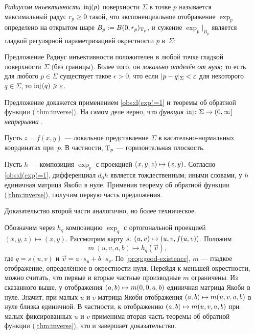 \emph{Радиусом инъективности} $\mathop{\rm inj}\nolimits(p)$ поверхности $\Sigma$ в точке $p$ называется максимальный радус $r_p\ge 0$ такой, что экспоненциальное отображение $\exp_p$ определено на открытом шаре $B_p\z\df B(0,r_p)_{\T_p}$,
и сужение $\exp_p|_{B_p}$ является гладкой регулярной параметризацией окрестности $p$ в~$\Sigma$;


\begin{thm}{Предложение}\label{prop:exp}
Радиус инъективности положителен в любой точке гладкой поверхности $\Sigma$ (без границы).
Более того, он {}\emph{локально отделён от нуля};
то есть для любого $p\in \Sigma$ существует такое $\epsilon>0$, что если $\dist{p}{q}\Sigma<\epsilon$ для некоторого $q\in \Sigma$, то $\mathop{\rm inj}\nolimits(q)\geqslant\varepsilon$.
\end{thm}

Предложение докажется применением \ref{obs:d(exp)=1} и теоремы об обратной функции (\ref{thm:inverse}).
На самом деле верно, что \textit{функция $\inj\:\Sigma\z\to (0,\infty]$ непрерывна} \cite[5.4]{gromoll-klingenberg-meyer}.

Пусть $z=f(x,y)$ --- локальное представление $\Sigma$ в касательно-нормальных координатах при~$p$.
В частности, $\mathrm{T}_p$ --- горизонтальная плоскость.

Пусть $h$ --- композиция $\exp_p$ с проекцией $(x,y,z)\z\mapsto (x,y)$.
Согласно \ref{obs:d(exp)=1}, дифференциал $d_0h$ является тождественным;
иными словами, у $h$ единичная матрица Якоби в нуле.
Применив теорему об обратной функции (\ref{thm:inverse}), получим первую часть предложения.

Доказательство второй части аналогично, но более техническое.

Обозначим через $h_q$ композицию $\exp_q$ с ортогональной проекцией $(x,y,z)\mapsto (x,y)$.
Рассмотрим карту $s\:(u,v)\z\mapsto (u,v,f(u,v))$.
Положим 
\[m\:(u,v,a,b)\mapsto h_q(\vec v),\]
где $q=s(u,v)$ и $\vec v=a\cdot s_u+b\cdot s_v$.
По \ref{prop:geod-existence}, $m$ --- гладкое отображение, определённое в окрестности нуля.
Перейдя к меньшей окрестности, можно считать, что первые и вторые частные производные $m$ ограничены.
Из сказанного выше, у отображения $(a,b)\z\mapsto m(0,0,a,b)$ единичная матрица Якоби в нуле.
Значит, при малых $u$ и $v$ матрица Якоби отображения $(a,b)\z\mapsto m(u,v,a,b)$ в нуле близка единичной.
В частности, к отображению $(a,b)\z\mapsto m(u,v,a,b)$ при малых фиксированных $u$ и $v$
применима вторая часть теоремы об обратной функции (\ref{thm:inverse}), что и завершает доказательство.
\qeds

